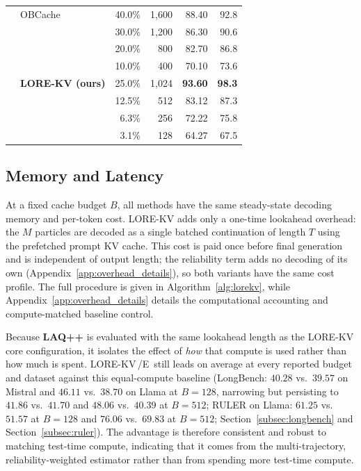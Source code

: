 \documentclass{article} %
\newcommand{\best}[1]{\textcolor{bestblue}{\textbf{#1}}}
\newcommand{\second}[1]{\textcolor{secondorange}{#1}}
\newcommand{\lorekvE}{LORE-KV\,/E}
\begin{document}
\begin{table}[t]
\begin{tabular}{@{}llrrrr@{}}
& OBCache
& 40.0\% & 1,600 & \second{88.40} & \second{92.8} \\
&
& 30.0\% & 1,200 & 86.30 & 90.6 \\
&
& 20.0\% & 800 & 82.70 & 86.8 \\
&
& 10.0\% & 400 & 70.10 & 73.6 \\

\addlinespace[2pt]

& \textbf{LORE-KV (ours)}
& 25.0\% & 1,024 & \best{93.60} & \best{98.3} \\
&
& 12.5\% & 512 & 83.12 & 87.3 \\
&
& 6.3\% & 256 & 72.22 & 75.8 \\
&
& 3.1\% & 128 & 64.27 & 67.5 \\

\bottomrule
\end{tabular}

\vspace{-4pt}
\end{table}

\subsection{Memory and Latency} \label{subsec:efficiency}
At a fixed cache budget $B$, all methods have the same steady-state decoding memory and per-token cost. LORE-KV adds only a one-time lookahead overhead: the $M$ particles are decoded as a single batched continuation of length $T$ using the prefetched prompt KV cache. This cost is paid once before final generation and is independent of output length; the reliability term adds no decoding of its own (Appendix~\ref{app:overhead_details}), so both variants have the same cost profile. The full procedure is given in Algorithm~\ref{alg:lorekv}, while Appendix~\ref{app:overhead_details} details the computational accounting and compute-matched baseline control.

Because \textbf{LAQ++} \citep{wang2025lookahead} is evaluated with the same lookahead length as the LORE-KV core configuration, it isolates the effect of \emph{how} that compute is used rather than how much is spent. \lorekvE\ still leads on average at every reported budget and dataset against this equal-compute baseline (LongBench: $40.28$ vs.\ $39.57$ on Mistral and $46.11$ vs.\ $38.70$ on Llama at $B{=}128$, narrowing but persisting to $41.86$ vs.\ $41.70$ and $48.06$ vs.\ $40.39$ at $B{=}512$; RULER on Llama: $61.25$ vs.\ $51.57$ at $B{=}128$ and $76.06$ vs.\ $69.83$ at $B{=}512$; Section~\ref{subsec:longbench} and Section~\ref{subsec:ruler}). The advantage is therefore consistent and robust to matching test-time compute, indicating that it comes from the multi-trajectory, reliability-weighted estimator rather than from spending more test-time compute.
\end{document}
